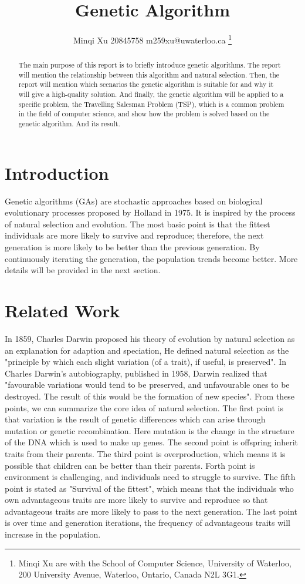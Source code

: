 \documentclass[letterpaper, 12 pt, conference]{ieeeconf}  %
\title{\LARGE \bf Genetic Algorithm}
\author{Minqi Xu   20845758   m259xu@uwaterloo.ca %
\thanks{Minqi Xu  are with the 
 School of Computer Science, University of Waterloo,
200 University Avenue, Waterloo, Ontario, Canada N2L 3G1.        {\tt\small }}%
}
\begin{document}
\onecolumn
\maketitle
%
\begin{abstract}
The main purpose of this report is to briefly introduce genetic algorithms. The report will mention the relationship between this algorithm and natural selection. Then, the report will mention which scenarios the genetic algorithm is suitable for and why it will give a high-quality solution. And finally, the genetic algorithm will be applied to a specific problem, the Travelling Salesman Problem (TSP), which is a common problem in the field of computer science, and show how the problem is solved based on the genetic algorithm. And its result.
\end{abstract}
%

\section{Introduction}
\label{sec:intro}
Genetic algorithms (GAs) are stochastic approaches based on biological evolutionary processes proposed by Holland in 1975.\cite{Ho75} It is inspired by the process of natural selection and evolution. The most basic point is that the fittest individuals are more likely to survive and reproduce; therefore, the next generation is more likely to be better than the previous generation. By continuously iterating the generation, the population trends become better. More details will be provided in the next section.


\section{Related Work}
\label{sec:rw}
In 1859, Charles Darwin proposed his theory of evolution by natural selection as an explanation for adaption and speciation, He defined natural selection as the "principle by which each slight variation (of a trait), if useful, is preserved". \cite{Cd59} In Charles Darwin's autobiography, published in 1958, Darwin realized that "favourable variations would tend to be preserved, and unfavourable ones to be destroyed. The result of this would be the formation of new species". \cite{Cd58} From these points, we can summarize the core idea of natural selection. The first point is that variation is the result of genetic differences which can arise through mutation or genetic recombination. Here mutation is the change in the structure of the DNA which is used to make up genes. The second point is offspring inherit traits from their parents. The third point is overproduction, which means it is possible that children can be better than their parents. Forth point is environment is challenging, and individuals need to struggle to survive. The fifth point is stated as "Survival of the fittest", which means that the individuals who own advantageous traits are more likely to survive and reproduce so that advantageous traits are more likely to pass to the next generation. The last point is over time and generation iterations, the frequency of advantageous traits will increase in the population.
\end{document}
